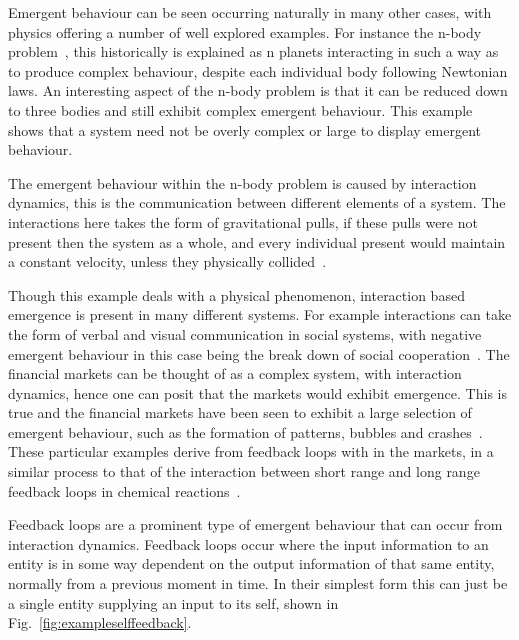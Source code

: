 \documentclass{article}
\begin{document}
Emergent behaviour can be seen occurring naturally in many other cases, with physics offering a number of well explored examples. For instance the n-body problem~\cite{nbodyproblem}, this historically is explained as n planets interacting in such a way as to produce complex behaviour, despite each individual body following Newtonian laws. An interesting aspect of the n-body problem is that it can be reduced down to three bodies and still exhibit complex emergent behaviour. This example shows that a system need not be overly complex or large to display emergent behaviour.

The emergent behaviour within the n-body problem is caused by interaction dynamics, this is the communication between different elements of a system. The interactions here takes the form of gravitational pulls, if these pulls were not present then the system as a whole, and every individual present would maintain a constant velocity, unless they physically collided~\cite{newtonconstantvelocity}.

Though this example deals with a physical phenomenon, interaction based emergence is present in many different systems. For example interactions can take the form of verbal and visual communication in social systems, with negative emergent behaviour in this case being the break down of social cooperation~\cite{socialemrgence}. The financial markets can be thought of as a complex system, with interaction dynamics, hence one can posit that the markets would exhibit emergence. This is true and the financial markets have been seen to exhibit a large selection of emergent behaviour, such as the formation of patterns, bubbles and crashes~\cite{bubblesandcrashes}. These particular examples derive from feedback loops with in the markets, in a similar process to that of the interaction between short range and long range feedback loops in chemical reactions~\cite{turningchemical}.     

Feedback loops are a prominent type of emergent behaviour that can occur from interaction dynamics. Feedback loops occur where the input information to an entity is in some way dependent on the output information of that same entity, normally from a previous moment in time. In their simplest form this can just be a single entity supplying an input to its self, shown in Fig.~\ref{fig:exampleselffeedback}.
\end{document}
